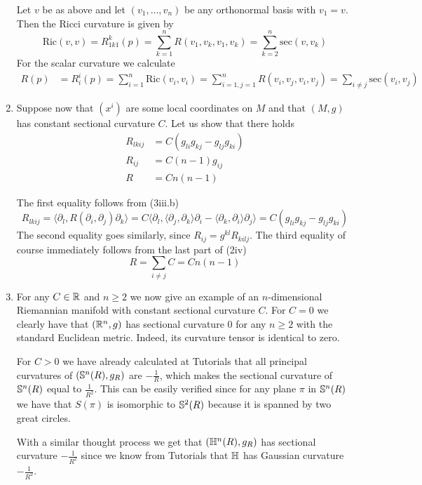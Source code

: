 \documentclass[a4paper, 12pt]{article}
\begin{document}
\begin{Exercise}
\begin{enumerate}[label=(\roman*)]
            Let $v$ be as above and let $(v_1,\dots,v_n)$ be any orthonormal basis with $v_1 = v$.
            Then the Ricci curvature is given by
            \[
                \text{Ric}(v, v)
                = R_{1k1}^k(p)
                = \sum_{k=1}^{n} R(v_1,v_k,v_1,v_k)
                = \sum_{k=2}^{n}\text{sec}(v, v_k)
            \]
            For the scalar curvature we calculate
            \begin{align*}
                R(p)
                &= R_i^i(p)
                = \sum_{i=1}^{n}\text{Ric}(v_i,v_i)
                = \sum_{i=1,j=1}^{n}R(v_i,v_j,v_i,v_j)
                = \sum_{i\neq j} \text{sec}(v_i,v_j)
            \end{align*}
        \item Suppose now that $(x^i)$ are some local coordinates on $M$
            and that $(M, g)$ has constant sectional curvature $C$.
            Let us show that there holds
            \begin{align*}
                R_{lkij} &= C(g_{li}g_{kj} - g_{lj}g_{ki}) \\
                R_{ij} &= C(n-1)g_{ij} \\
                R &= Cn(n-1)
            \end{align*}
            
            The first equality follows from (3iii.b)
            \[
                R_{lkij}
                =\langle \partial_l, R(\partial_i,\partial_j)\partial_k\rangle
                = C \langle \partial_l, \langle \partial_j,\partial_k\rangle\partial_i - \langle \partial_k,\partial_i\rangle\partial_j\rangle
                = C(g_{li}g_{kj} - g_{lj}g_{ki})
            \]
            The second equality goes similarly, since $R_{ij} = g^{kl}R_{kilj}$.
            The third equality of course immediately follows from the last part of (2iv)
            \[
                R = \sum_{i\neq j} C = Cn(n-1)
            \]
        \item For any $C \in \R$ and $n \geq 2$ we now give an example of an $n$-dimensional Riemannian manifold with constant sectional curvature $C$.
            For $C = 0$ we clearly have that $(\R^n, g)$ has sectional curvature $0$ for any $n \geq 2$ with the standard Euclidean metric.
            Indeed, its curvature tensor is identical to zero.

            For $C > 0$ we have already calculated at Tutorials that all principal curvatures of $(\S^n(R), g_R)$ are $-\frac{1}{R}$,
            which makes the sectional curvature of $\S^n(R)$ equal to $\frac{1}{R^2}$.
            This can be easily verified since for any plane $\pi$ in $\S^n(R)$ we have that $S(\pi)$ is isomorphic to $\S^2(R)$ because it is spanned by two great circles.

            With a similar thought process we get that $(\H^n(R), g_R)$ has sectional curvature $-\frac{1}{R^2}$ since we know from Tutorials that $\H$ has Gaussian curvature $-\frac{1}{R^2}$.
    \end{enumerate}
\end{Exercise}
\end{document}
